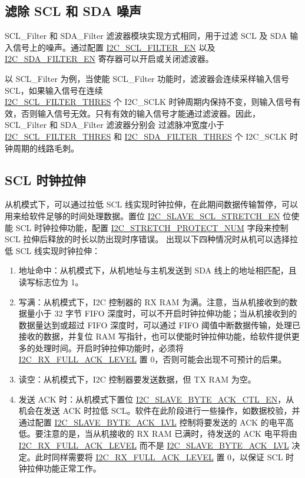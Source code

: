 \documentclass[main\_\_CN.tex]{subfiles}
\begin{document}
\subsection{滤除 SCL 和 SDA 噪声}
SCL\_Filter 和 SDA\_Filter 滤波器模块实现方式相同，用于过滤 SCL 及 SDA 输入信号上的噪声。通过配置 \hyperref[fielddesc:I2CSCLFILTEREN]{I2C\_SCL\_FILTER\_EN} 以及 \hyperref[fielddesc:I2CSDAFILTEREN]{I2C\_SDA\_FILTER\_EN} 寄存器可以开启或关闭滤波器。

以 SCL\_Filter 为例，当使能 SCL\_Filter 功能时，滤波器会连续采样输入信号 SCL，如果输入信号在连续 \\\hyperref[fielddesc:I2CSCLFILTERTHRES]{I2C\_SCL\_FILTER\_THRES} 个 I2C\_SCLK 时钟周期内保持不变，则输入信号有效，否则输入信号无效。只有有效的输入信号才能通过滤波器。因此，SCL\_Filter 和 SDA\_Filter 滤波器分别会
过滤脉冲宽度小于 \hyperref[fielddesc:I2CSCLFILTERTHRES]{I2C\_SCL\_FILTER\_THRES} 和 \hyperref[fielddesc:I2CSDAFILTERTHRES]{I2C\_SDA\_FILTER\_THRES} 个 I2C\_SCLK 时钟周期的线路毛刺。

\subsection{SCL 时钟拉伸}
从机模式下，可以通过拉低 SCL 线实现时钟拉伸，在此期间数据传输暂停，可以用来给软件足够的时间处理数据。置位 \hyperref[fielddesc:I2CSLAVESCLSTRETCHEN]{I2C\_SLAVE\_SCL\_STRETCH\_EN} 位使能 SCL 时钟拉伸功能，配置 \hyperref[fielddesc:I2CSTRETCHPROTECTNUM]{I2C\_STRETCH\_PROTECT\_NUM} 字段来控制 SCL 拉伸后释放的时长以防出现时序错误。
出现以下四种情况时从机可以选择拉低 SCL 线实现时钟拉伸：

\begin{enumerate}
\item 地址命中：从机模式下，从机地址与主机发送到 SDA 线上的地址相匹配，且读写标志位为 1。
\item 写满：从机模式下，I2C 控制器的 RX RAM 为满。注意，当从机接收到的数据量小于 32 字节 FIFO 深度时，可以不开启时钟拉伸功能；当从机接收到的数据量达到或超过 FIFO 深度时，可以通过 FIFO 阈值中断数据传输，处理已接收的数据，并复位 RAM 写指针，也可以使能时钟拉伸功能，给软件提供更多的处理时间。开启时钟拉伸功能时，必须将 \hyperref[fielddesc:I2CRXFULLACKLEVEL]{I2C\_RX\_FULL\_ACK\_LEVEL} 置 0，否则可能会出现不可预计的后果。
\item 读空：从机模式下，I2C 控制器要发送数据，但 TX RAM 为空。
\item 发送 ACK 时：从机模式下置位 \hyperref[fielddesc:I2CSLAVEBYTEACKCTLEN]{I2C\_SLAVE\_BYTE\_ACK\_CTL\_EN}，从机会在发送 ACK 时拉低 SCL。软件在此阶段进行一些操作，如数据校验，并通过配置 \hyperref[fielddesc:I2CSLAVEBYTEACKLVL]{I2C\_SLAVE\_BYTE\_ACK\_LVL} 控制将要发送的 ACK 的电平高低。要注意的是，当从机接收的 RX RAM 已满时，待发送的 ACK 电平将由 \hyperref[fielddesc:I2CRXFULLACKLEVEL]{I2C\_RX\_FULL\_ACK\_LEVEL} 而不是 \hyperref[fielddesc:I2CSLAVEBYTEACKLVL]{I2C\_SLAVE\_BYTE\_ACK\_LVL} 决定。此时同样需要将 \hyperref[fielddesc:I2CRXFULLACKLEVEL]{I2C\_RX\_FULL\_ACK\_LEVEL} 置 0，以保证 SCL 时钟拉伸功能正常工作。
\end{enumerate}
\end{document}
